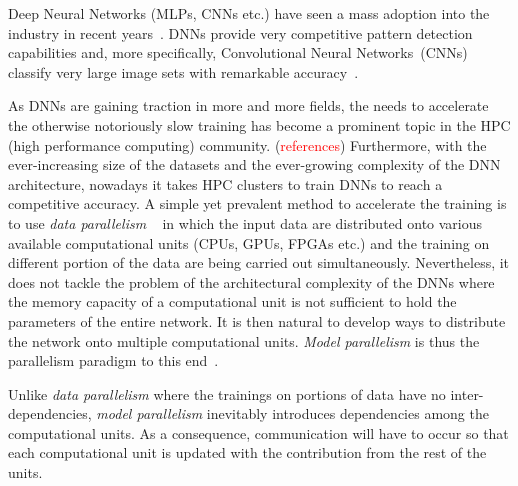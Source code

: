 Deep Neural Networks (MLPs, CNNs etc.) have seen a mass adoption into the
industry in recent years~\cite{Acoustic, Language, Ciregan2012}. DNNs provide
very competitive pattern detection capabilities and, more specifically,
Convolutional Neural Networks~(CNNs) classify very large image sets with
remarkable accuracy~\cite{Krizhevsky2012}. 

As DNNs are gaining traction in more and more fields, the needs to accelerate
the otherwise notoriously slow training has become a prominent topic in the
HPC (high performance computing) community. (\textcolor{red}{references})
Furthermore, with the ever-increasing size of the datasets and the
ever-growing complexity of the DNN architecture, nowadays it takes HPC
clusters to train DNNs to reach a competitive accuracy. A simple yet
prevalent method to accelerate the training is to use \emph{data parallelism}
~\cite{model1, pserver} in which the input data are distributed onto various
available computational units (CPUs, GPUs, FPGAs etc.) and the training on
different portion of the data are being carried out simultaneously.
Nevertheless, it does not tackle the problem of the architectural complexity
of the DNNs where the memory capacity of a computational unit is not
sufficient to hold the parameters of the entire network. It is then natural
to develop ways to distribute the network onto multiple computational units.
\emph{Model parallelism} is thus the parallelism paradigm to this
end~\cite{model0,model1}.

Unlike \emph{data parallelism} where the trainings on portions of data have
no inter-dependencies, \emph{model parallelism} inevitably introduces
dependencies among the computational units. As a consequence, communication
will have to occur so that each computational unit is updated with the contribution
from the rest of the units. 